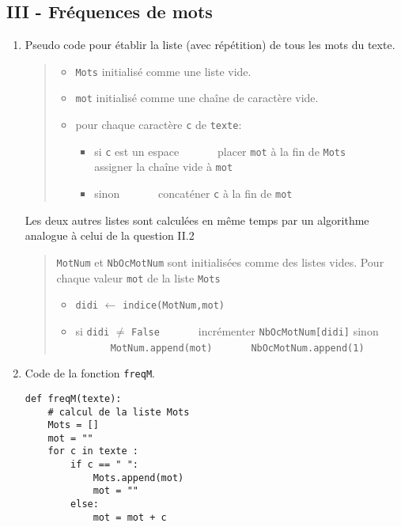 \subsection*{III - Fréquences de mots}
\begin{enumerate}
  \item Pseudo code pour établir la liste (avec répétition) de tous les mots du texte.
\begin{quote}
\begin{itemize}
  \item \texttt{Mots} initialisé comme une liste vide.
  \item \texttt{mot} initialisé comme une chaîne de caractère vide.
  \item pour chaque caractère \texttt{c} de \texttt{texte}:
  \begin{itemize}
    \item si \texttt{c} est un espace\newline
    $\phantom{:}\hspace{1cm}$ placer \texttt{mot} à la fin de \texttt{Mots}\newline
    $\phantom{:}\hspace{1cm}$ assigner la chaîne vide à \texttt{mot}
    \item sinon\newline
    $\phantom{:}\hspace{1cm}$ concaténer \texttt{c} à la fin de \texttt{mot}
  \end{itemize}
\end{itemize}
\end{quote}
Les deux autres listes sont calculées en même temps par un algorithme analogue à celui de la question II.2
\begin{quote}
  \texttt{MotNum} et \texttt{NbOcMotNum} sont initialisées comme des listes vides.
  Pour chaque valeur \texttt{mot} de la liste \texttt{Mots}
  \begin{itemize}
    \item \texttt{didi} $\leftarrow$ \texttt{indice(MotNum,mot)}
    \item si \texttt{didi} $\neq$ \texttt{False}\newline
    $\phantom{:}\hspace{1cm}$ incrémenter \texttt{NbOcMotNum[didi]}\newline
    sinon\newline
    $\phantom{:}\hspace{1cm}$ \texttt{MotNum.append(mot)}\newline
    $\phantom{:}\hspace{1cm}$ \texttt{NbOcMotNum.append(1)}
  \end{itemize}
\end{quote}
\item Code de la fonction \texttt{freqM}.
\begin{verbatim}
def freqM(texte):
    # calcul de la liste Mots
    Mots = []
    mot = ""
    for c in texte :
        if c == " ":
            Mots.append(mot)
            mot = ""
        else:
            mot = mot + c


\end{verbatim}
\end{enumerate}
